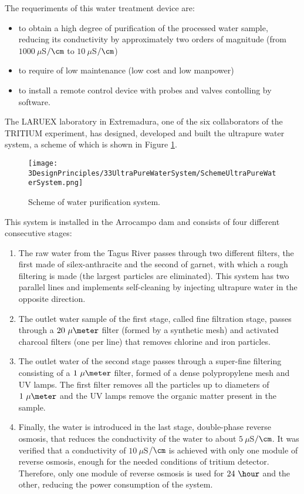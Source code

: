 The requeriments of this water treatment device are:

\begin{itemize}

\item{} to obtain a high degree of purification of the processed water sample, reducing its conductivity by approximately two orders of magnitude (from $1000~\mu$S$/\cm$ to $10~\mu$S$/\cm$)

\item{} to require of low maintenance (low cost  and low manpower)

\item{} to install a remote control device with probes and valves contolling by software.
\end{itemize}

The LARUEX laboratory in Extremadura, one of the six collaborators of the TRITIUM experiment, has designed, developed and built the ultrapure water system, a scheme of which is shown in Figure \ref{fig:WPSScheme}.

\begin{figure}[htbp]
\centering
\texttt{[image: 3DesignPrinciples/33UltraPureWaterSystem/SchemeUltraPureWaterSystem.png]}
\caption{Scheme of water purification system.\label{fig:WPSScheme}}
\end{figure}

This system is installed in the Arrocampo dam and consists of four different consecutive stages:

\begin{enumerate}
\item{} The raw water from the Tagus River passes through two different filters, the first made of silex-anthracite and the second of garnet, with which a rough filtering is made (the largest particles are eliminated). This system has two parallel lines and implements self-cleaning by injecting ultrapure water in the opposite direction.

\item{} The outlet water sample of the first stage, called fine filtration stage, passes through a $20~\mu\meter$ filter (formed by a synthetic mesh) and activated charcoal filters (one per line) that removes chlorine and iron particles.

\item{} The outlet water of the second stage passes through a super-fine filtering consisting of a $1~\mu\meter$ filter, formed of a dense polypropylene mesh and UV lamps. The first filter removes all the particles up to diameters of $1~\mu\meter$ and the UV lamps remove the organic matter present in the sample.

\item{} Finally, the water is introduced in the last stage, double-phase reverse osmosis, that reduces the conductivity of the water to about $5~\mu$S$/\cm$. It was verified that a conductivity of $10~\mu$S$/\cm$ is achieved with only one module of reverse osmosis, enough for the needed conditions of tritium detector. Therefore, only one module of reverse osmosis is used for $24~\hour$ and the other, reducing the power consumption of the system.

\end{enumerate}


